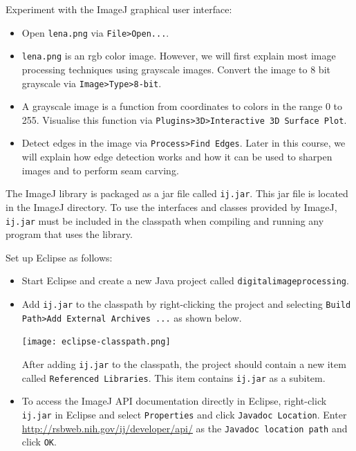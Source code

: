 \documentclass{book}
\begin{document}
\begin{exercise}
Experiment with the ImageJ graphical user interface:
\begin{itemize}
  \item Open \texttt{lena.png} via \texttt{File>Open...}.
  \item \texttt{lena.png} is an rgb color image. However, we will first explain most image processing techniques using grayscale images. Convert the image to 8 bit grayscale via \texttt{Image>Type>8-bit}.
  \item A grayscale image is a function from coordinates to colors in the range 0 to 255. Visualise this function via  \texttt{Plugins>3D>Interactive 3D Surface Plot}. 
  \item Detect edges in the image via \texttt{Process>Find Edges}. Later in this course, we will explain how edge detection works and how it can be used to sharpen images and to perform seam carving.
\end{itemize} 
\end{exercise}

The ImageJ library is packaged as a jar file called \texttt{ij.jar}. This jar file is located in the ImageJ directory. To use the interfaces and classes provided by ImageJ, \texttt{ij.jar} must be included in the classpath when compiling and running any program that uses the library. 

\begin{exercise}
Set up Eclipse as follows:
\begin{itemize}
  \item Start Eclipse and create a new Java project called \texttt{digitalimageprocessing}.
  \item Add \texttt{ij.jar} to the classpath by right-clicking the project and selecting \texttt{Build Path>Add External Archives ...} as shown below.
  \begin{center}
  \texttt{[image: eclipse-classpath.png]}
  \end{center}
  After adding \texttt{ij.jar} to the classpath, the project should contain a new item called \texttt{Referenced Libraries}. This item contains \texttt{ij.jar} as a subitem. 
  \item To access the ImageJ API documentation directly in Eclipse, right-click \texttt{ij.jar} in Eclipse and select \texttt{Properties} and click \texttt{Javadoc Location}. Enter \href{http://rsbweb.nih.gov/ij/developer/api/}{http://rsbweb.nih.gov/ij/developer/api/} as the \texttt{Javadoc location path} and click \texttt{OK}.  
\end{itemize}
\end{exercise}
\end{document}
